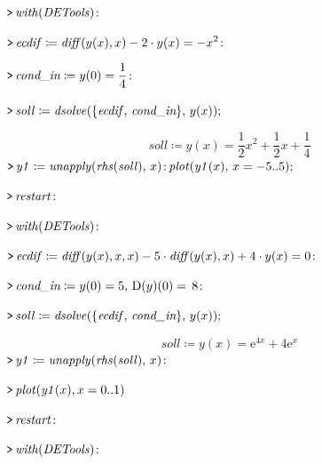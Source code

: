 \documentclass{article}
\begin{document}
\mapleinput
{$ \displaystyle \texttt{>\,} \mathit{with} (\mathit{DETools})\colon  $}

\mapleinput
{$ \displaystyle \texttt{>\,} \mathit{ecdif} \coloneqq \mathit{diff} (y (x),x)-2\cdot y (x)=-x^{2}\colon  $}

\mapleinput
{$ \displaystyle \texttt{>\,} \textit{cond\_in} \coloneqq y (0)=\frac{1}{4}\colon  $}

\mapleinput
{$ \displaystyle \texttt{>\,} \mathit{soll} \coloneqq \mathit{dsolve} (\{\mathit{ecdif} ,\,\textit{cond\_in} \},\,y (x)); $}

\begin{dmath}\label{(22)}
\mathit{soll} \coloneqq y \! \left(x \right)=\frac{1}{2} x^{2}+\frac{1}{2} x +\frac{1}{4}
\end{dmath}
\mapleinput
{$ \displaystyle \texttt{>\,} \mathit{y1} \coloneqq \mathit{unapply} (\mathit{rhs} (\mathit{soll}),\,x)\colon 
\\
 \,\mathit{plot} (\mathit{y1} (x),\,x =-5..5); $}

{}
\mapleinput
{$ \displaystyle \texttt{>\,} \mathit{restart} \colon  $}

\mapleinput
{$ \displaystyle \texttt{>\,} \mathit{with} (\mathit{DETools})\colon  $}

\mapleinput
{$ \displaystyle \texttt{>\,} \mathit{ecdif} \coloneqq \mathit{diff} (y (x),x ,x)-5\cdot \mathit{diff} (y (x),x)+4\cdot y (x)=0\colon  $}

\mapleinput
{$ \displaystyle \texttt{>\,} \textit{cond\_in} \coloneqq y (0)=5,\,\mathrm{D}(y)(0)=\,8\colon  $}

\mapleinput
{$ \displaystyle \texttt{>\,} \mathit{soll} \coloneqq \mathit{dsolve} (\{\mathit{ecdif} ,\,\textit{cond\_in} \},\,y (x)); $}

\begin{dmath}\label{(23)}
\mathit{soll} \coloneqq y \! \left(x \right)={\mathrm e}^{4 x}+4 {\mathrm e}^{x}
\end{dmath}
\mapleinput
{$ \displaystyle \texttt{>\,} \mathit{y1} \coloneqq \mathit{unapply} (\mathit{rhs} (\mathit{soll}),\,x)\colon  $}

\mapleinput
{$ \displaystyle \texttt{>\,} \mathit{plot} (\mathit{y1} (x),x =0..1) $}

{}
\mapleinput
{$ \displaystyle \texttt{>\,} \mathit{restart} \colon  $}

\mapleinput
{$ \displaystyle \texttt{>\,} \mathit{with} (\mathit{DETools})\colon  $}
\end{document}
